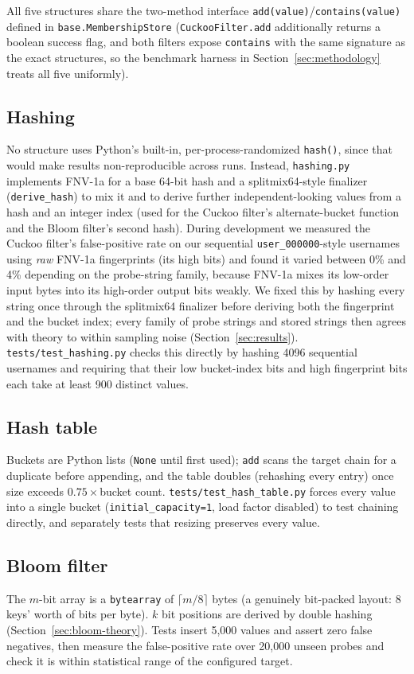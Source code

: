 \documentclass[acmsmall,screen,nonacm=true]{acmart}
\begin{document}
All five structures share the two-method interface
\texttt{add(value)}/\texttt{contains(value)} defined in
\texttt{base.MembershipStore} (\texttt{CuckooFilter.add} additionally
returns a boolean success flag, and both filters expose \texttt{contains}
with the same signature as the exact structures, so the benchmark harness
in Section~\ref{sec:methodology} treats all five uniformly).

\subsection{Hashing}
\label{sec:hashing}
No structure uses Python's built-in, per-process-randomized \texttt{hash()},
since that would make results non-reproducible across runs. Instead,
\texttt{hashing.py} implements FNV-1a \cite{fnv} for a base 64-bit hash and
a splitmix64-style finalizer (\texttt{derive\_hash}) to mix it and to derive
further independent-looking values from a hash and an integer index (used
for the Cuckoo filter's alternate-bucket function and the Bloom filter's
second hash). During development we measured the Cuckoo filter's
false-positive rate on our sequential \texttt{user\_000000}-style usernames
using \emph{raw} FNV-1a fingerprints (its high bits) and found it varied
between 0\% and 4\% depending on the probe-string family, because FNV-1a
mixes its low-order input bytes into its high-order output bits weakly. We
fixed this by hashing every string once through the splitmix64 finalizer
before deriving both the fingerprint and the bucket index; every family of
probe strings and stored strings then agrees with theory to within sampling
noise (Section~\ref{sec:results}). \texttt{tests/test\_hashing.py} checks
this directly by hashing 4096 sequential usernames and requiring that their
low bucket-index bits and high fingerprint bits each take at least 900
distinct values.

\subsection{Hash table}
Buckets are Python lists (\texttt{None} until first used); \texttt{add}
scans the target chain for a duplicate before appending, and the table
doubles (rehashing every entry) once size exceeds $0.75\times$bucket count.
\texttt{tests/test\_hash\_table.py} forces every value into a single bucket
(\texttt{initial\_capacity=1}, load factor disabled) to test chaining
directly, and separately tests that resizing preserves every value.

\subsection{Bloom filter}
The $m$-bit array is a \texttt{bytearray} of $\lceil m/8\rceil$ bytes
(a genuinely bit-packed layout: 8 keys' worth of bits per byte). $k$ bit
positions are derived by double hashing (Section~\ref{sec:bloom-theory}).
Tests insert 5{,}000 values and assert zero false negatives, then measure
the false-positive rate over 20{,}000 unseen probes and check it is within
statistical range of the configured target.
\end{document}
